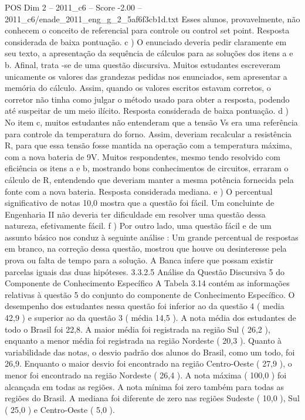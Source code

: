 \begin{textsample}{POS Dim 2 – 2011\_c6 – Score -2.00 – 2011\_c6/enade\_2011\_eng\_g\_2\_5af6f3cb1d.txt}
Esses alunos, provavelmente, não conhecem o conceito de referencial para controle ou control set point.
Resposta considerada de baixa pontuação. c ) O enunciado deveria pedir claramente em seu texto, a apresentação da sequência de cálculos para as soluções dos itens a e b.
Afinal, trata -se de uma questão discursiva.
Muitos estudantes escreveram unicamente os valores das grandezas pedidas nos enunciados, sem apresentar a memória do cálculo.
Assim, quando os valores escritos estavam corretos, o corretor não tinha como julgar o método usado para obter a resposta, podendo até suspeitar de um meio ilícito.
Resposta considerada de baixa pontuação. d ) No item c, muitos estudantes não entenderam que a tensão Vs era uma referência para controle da temperatura do forno.
Assim, deveriam recalcular a resistência R, para que essa tensão fosse mantida na operação com a temperatura máxima, com a nova bateria de 9V.
Muitos respondentes, mesmo tendo resolvido com eficiência os itens a e b, mostrando bons conhecimentos de circuitos, erraram o cálculo de R, entendendo que deveriam manter a mesma potência fornecida pela fonte com a nova bateria.
Resposta considerada mediana. e ) O percentual significativo de notas 10,0 mostra que a questão foi fácil.
Um concluinte de Engenharia II não deveria ter dificuldade em resolver uma questão dessa natureza, efetivamente fácil. f ) Por outro lado, uma questão fácil e de um assunto básico nos conduz à seguinte análise : Um grande percentual de respostas em branco, na correção dessa questão, mostrou que houve ou desinteresse pela prova ou falta de tempo para a solução.
A Banca infere que possam existir parcelas iguais das duas hipóteses. 3.3.2.5 Análise da Questão Discursiva 5 do Componente de Conhecimento Específico A Tabela 3.14 contém as informações relativas à questão 5 do conjunto do componente de Conhecimento Específico.
O desempenho dos estudantes nessa questão foi inferior ao da questão 4 ( media 42,9 ) e superior ao da questão 3 ( média 14,5 ).
A nota média dos estudantes de todo o Brasil foi 22,8.
A maior média foi registrada na região Sul ( 26,2 ), enquanto a menor média foi registrada na região Nordeste ( 20,3 ).
Quanto à variabilidade das notas, o desvio padrão dos alunos do Brasil, como um todo, foi 26,9.
Enquanto o maior desvio foi encontrado na região Centro-Oeste ( 27,9 ), o menor foi encontrado na região Nordeste ( 26,4 ).
A nota máxima ( 100,0 ) foi alcançada em todas as regiões.
A nota mínima foi zero também para todas as regiões do Brasil.
A mediana foi diferente de zero nas regiões Sudeste ( 10,0 ), Sul ( 25,0 ) e Centro-Oeste ( 5,0 ).

\end{textsample}
